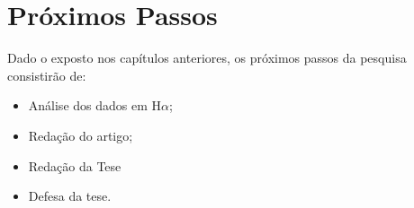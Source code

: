 \chapter{Próximos Passos}
\label{cap05}

Dado o exposto nos capítulos anteriores, os próximos passos da pesquisa consistirão de:
\begin{itemize}

\item Análise dos dados em H$\alpha$;
\item Redação do artigo;
\item Redação da Tese
\item Defesa da tese.
\end{itemize}
